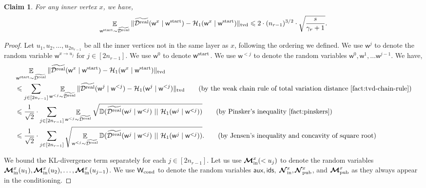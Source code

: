 \documentclass[11pt]{article}
\newtheorem{claim}[lemma]{Claim}
\theoremstyle{definition}
\renewcommand{\leq}{\leqslant}
\newcommand{\tvd}[2]{\ensuremath{\norm{#1 - #2}_{\mathrm{tvd}}}}
\newcommand{\norm}[1]{\ensuremath{\|#1\|}}
\DeclareMathOperator*{\Exp}{\ensuremath{{\mathbb{E}}}}
\newcommand{\rv}[1]{\ensuremath{{\mathsf{#1}}}\xspace}
\newcommand{\kl}[2]{\ensuremath{\mathbb{D}(#1~||~#2)}}
\newcommand{\rNinner}[2]{\ensuremath{\bm{\mathcal{N}}_{\textnormal{in}}^{#1_{#2}}}}
\newcommand{\cH}{\ensuremath{\mathcal{H}}}
\newcommand{\cD}{\ensuremath{\mathcal{D}}}
\newcommand{\cDreal}{\ensuremath{\cD^{\textnormal{real}}}}
\newcommand{\cDrealtil}{\ensuremath{\widetilde{\cDreal}}}
\newcommand{\raux}{\ensuremath{\rv{aux}}}
\newcommand{\rNpub}[1]{\ensuremath{\bm{\mathcal{N}}_{\textnormal{pub}}^{#1}}}
\newcommand{\rMpub}[1]{\ensuremath{\bm{\mathcal{M}}_{\textnormal{pub}}^{#1}}}
\newcommand{\rMinner}[1]{\ensuremath{\bm{\mathcal{M}}_{\textnormal{in}}^{#1}}}
\newcommand{\rids}{\ensuremath{\rv{ids}}}
\newcommand{\rWcond}{\ensuremath{\rv{W}_{\textnormal{cond}}}}
\newcommand{\rw}{\rv{w}}
\newcommand{\rwstart}{\rv{w}^{\textnormal{start}}}
\begin{document}
\begin{claim}\label{clm:inter-hybrid-1}
		For any inner vertex $x$, we have, 
		\[
			\Exp_{\rwstart \sim \cDrealtil} \tvd{\cDrealtil(\rw^{x} \mid \rwstart )}{\cH_1(\rw^{x} \mid \rwstart )} \leq 2 \cdot (n_{r-1})^{3/2} \cdot \sqrt{\frac{s}{\gamma_r + 1}}.
		\]
\end{claim}
\begin{proof}
Let $u_1, u_2, \ldots, u_{2n_{r-1}}$ be all the inner vertices not in the same layer as $x$, following the ordering we defined.
We use $\rw^j$ to denote the random variable $\rw^{x\to u_j}$ for $j \in [2n_{r-1}]$. We use $\rw^0$ to denote $\rwstart$. We use $\rw^{<j}$ to denote the random variables $\rw^0, \rw^1, \ldots \rw^{j-1}$.
We have, 
\begin{align*}
&\Exp_{\rwstart \sim \cDrealtil} \tvd{\cDrealtil(\rw^{x} \mid \rwstart )}{\cH_1(\rw^{x} \mid \rwstart )} \\
&\leq  \sum_{j \in [2n_{r-1}]} \Exp_{\rw^{<j}\sim \cDrealtil} \tvd{\cDrealtil(\rw^j \mid \rw^{<j})}{\cH_1(\rw^j \mid \rw^{<j} )} \tag{by the weak chain rule of total variation distance \Cref{fact:tvd-chain-rule}}\\
&\leq \frac1{\sqrt{2}} \cdot \sum_{j \in [2n_{r-1}]}  \Exp_{\rw^{<j}\sim \cDrealtil} \sqrt{\kl{\cDrealtil(\rw^j \mid \rw^{<j} )}{\cH_1(\rw^j \mid \rw^{<j} )}} \tag{by Pinsker's inequality \Cref{fact:pinskers}} \\
&\leq \frac1{\sqrt{2}} \cdot \sum_{j \in [2n_{r-1}]}  \sqrt{ \Exp_{\rw^{<j}\sim \cDrealtil} \kl{\cDrealtil(\rw^j \mid \rw^{<j})}{\cH_1(\rw^j \mid \rw^{<j} )}}. \tag{by Jensen's inequality and concavity of square root} 
\end{align*}

We bound the KL-divergence term separately for each $j \in [2n_{r-1}]$. 
Let us use $\rMinner{x}(< u_{j})$ to denote the random variables $\rMinner{x}(u_1), \rMinner{x}(u_2), \ldots, \rMinner{x}(u_{j-1})$.  We use $\rWcond$ to denote the random variables $\raux, \rids,$ $ \rNinner{x}{}, \rNpub{x}$, and $\rMpub{x}$ as they always appear in the conditioning.


\end{proof}
\end{document}
